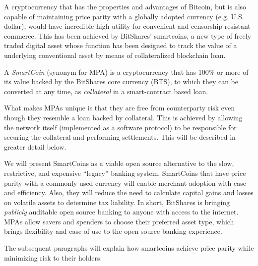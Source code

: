 \label{sec:mpa}

A cryptocurrency that has the properties and advantages of Bitcoin, but is also
capable of maintaining price parity with a globally adopted currency (e.g.
U.S. dollar), would have incredible high utility for convenient and
censorship-resistant commerce. This has been achieved by BitShares' smartcoins,
a new type of freely traded digital asset whose function has been designed to
track the value of a underlying conventional asset by means of collateralized
blockchain loan.

A \emph{SmartCoin} (synonym for MPA) is a cryptocurrency that has 100\% or more
of its value backed by the BitShares core currency (BTS), to which they can be
converted at any time, as \emph{collateral} in a smart-contract based loan.

What makes MPAs unique is that they are free from counterparty risk even though
they resemble a loan backed by collateral. This is achieved by allowing the
network itself (implemented as a software protocol) to be responsible for
securing the collateral and performing settlements. This will be described in
greater detail below.

We will present SmartCoins as a viable open source alternative to the slow,
restrictive, and expensive ``legacy'' banking system.  SmartCoins that have
price parity with a commonly used currency will enable merchant adoption with
ease and efficiency. Also, they will reduce the need to calculate capital gains
and losses on volatile assets to determine tax liability. In short, BitShares
is bringing \emph{publicly} auditable open source banking to anyone with access
to the internet. MPAs allow savers and spenders to choose their preferred asset
type, which brings flexibility and ease of use to the open source banking
experience.

The subsequent paragraphs will explain how smartcoins achieve price parity
while minimizing risk to their holders.
